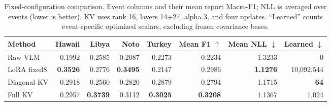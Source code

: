 \begin{table}[t]
\centering\small
\caption{Fixed-configuration comparison. Event columns and their mean report
Macro-F1; NLL is averaged over events (lower is better). KV uses rank 16,
layers 14+27, alpha 3, and four updates. ``Learned'' counts event-specific
optimized scalars, excluding frozen covariance bases.}
\label{tab:fixed}
\begin{tabular}{lrrrrrrr}
\toprule
Method & Hawaii & Libya & Noto & Turkey & Mean F1 $\uparrow$ & Mean NLL $\downarrow$ & Learned $\downarrow$\\
\midrule
Raw VLM & 0.1992 & 0.2585 & 0.2087 & 0.2273 & 0.2234 & 1.3233 & 0\\
LoRA fixed8 & \textbf{0.3526} & 0.2776 & \textbf{0.3495} & 0.2147 & 0.2986 & \textbf{1.1276} & 10,092,544\\
Diagonal KV & 0.2918 & 0.2560 & 0.2820 & 0.2879 & 0.2794 & 1.1715 & \textbf{64}\\
Full KV & 0.2957 & \textbf{0.3739} & 0.3112 & \textbf{0.3025} & \textbf{0.3208} & 1.1367 & 1,024\\
\bottomrule
\end{tabular}
\end{table}
